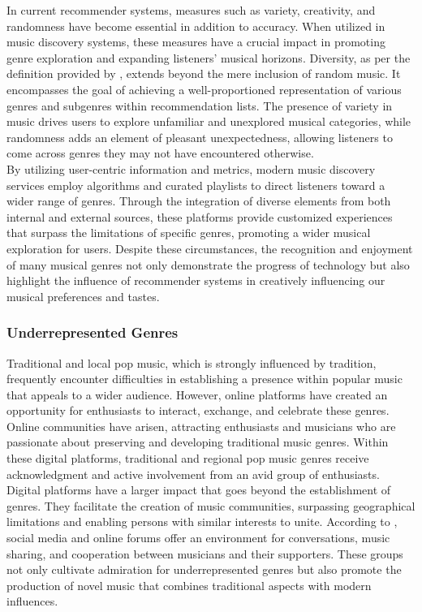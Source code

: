 In current recommender systems, measures such as variety, creativity, and randomness have become essential in addition to accuracy. When utilized in music discovery systems, these measures have a crucial impact in promoting genre exploration and expanding listeners' musical horizons. Diversity, as per the definition provided by \textcite{robinson20}, extends beyond the mere inclusion of random music. It encompasses the goal of achieving a well-proportioned representation of various genres and subgenres within recommendation lists. The presence of variety in music drives users to explore unfamiliar and unexplored musical categories, while randomness adds an element of pleasant unexpectedness, allowing listeners to come across genres they may not have encountered otherwise. \\

By utilizing user-centric information and metrics, modern music discovery services employ algorithms and curated playlists to direct listeners toward a wider range of genres. Through the integration of diverse elements from both internal and external sources, these platforms provide customized experiences that surpass the limitations of specific genres, promoting a wider musical exploration for users. Despite these circumstances, the recognition and enjoyment of many musical genres not only demonstrate the progress of technology but also highlight the influence of recommender systems in creatively influencing our musical preferences and tastes.

\subsubsection{Underrepresented Genres}
Traditional and local pop music, which is strongly influenced by tradition, frequently encounter difficulties in establishing a presence within popular music that appeals to a wider audience. However, online platforms have created an opportunity for enthusiasts to interact, exchange, and celebrate these genres. Online communities have arisen, attracting enthusiasts and musicians who are passionate about preserving and developing traditional music genres. Within these digital platforms, traditional and regional pop music genres receive acknowledgment and active involvement from an avid group of enthusiasts. \\

Digital platforms have a larger impact that goes beyond the establishment of genres. They facilitate the creation of music communities, surpassing geographical limitations and enabling persons with similar interests to unite. According to \textcite{silahudin19}, social media and online forums offer an environment for conversations, music sharing, and cooperation between musicians and their supporters. These groups not only cultivate admiration for underrepresented genres but also promote the production of novel music that combines traditional aspects with modern influences. \\

